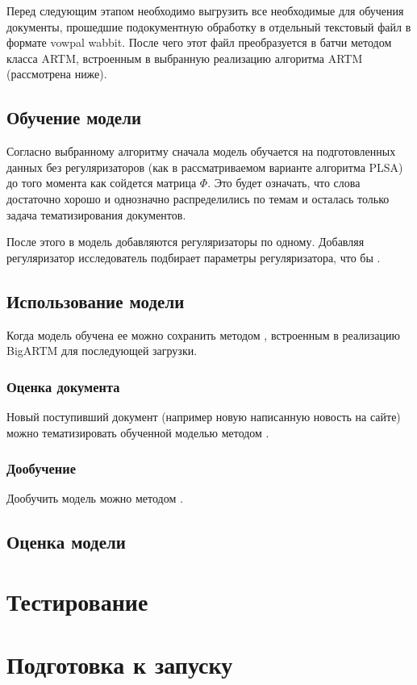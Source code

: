 Перед следующим этапом необходимо выгрузить все необходимые для обучения документы, прошедшие подокументную обработку в отдельный текстовый файл в формате vowpal wabbit. После чего этот файл преобразуется в батчи методом класса ARTM, встроенным в выбранную реализацию алгоритма ARTM (рассмотрена ниже).

\subsection{Обучение модели}

Согласно выбранному алгоритму сначала модель обучается на подготовленных данных без регуляризаторов (как в рассматриваемом варианте алгоритма PLSA) до того момента как сойдется матрица $\Phi$. Это будет означать, что слова достаточно хорошо и однозначно распределились по темам и осталась только задача тематизирования документов.

После этого в модель добавляются регуляризаторы по одному. Добавляя регуляризатор исследователь подбирает параметры регуляризатора, что бы \todo{}.

\subsection{Использование модели}

Когда модель обучена ее можно сохранить методом \todo{}, встроенным в реализацию BigARTM для последующей загрузки.

\subsubsection{Оценка документа}

Новый поступивший документ (например новую написанную новость на сайте) можно тематизировать обученной моделью методом \todo{}.

\subsubsection{Дообучение}
Дообучить модель можно методом \todo{}.

\subsection{Оценка модели}

%
\section{Тестирование}

%
\section{Подготовка к запуску}
